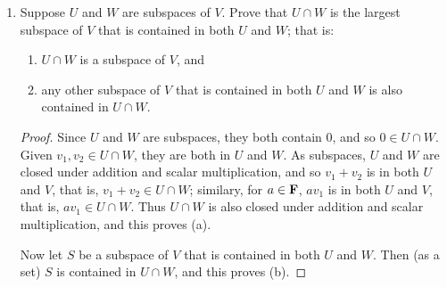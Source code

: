 \documentclass[11pt]{amsart}
\begin{document}
\begin{enumerate}[(1)]
\begin{proof}[Solution]
We claim that $W := \left\{ x^4 p(x) : \, p \in \P(\F) \right\}$ will do the trick (that is, $W$ consists of the zero polynomial and all polynomials that do not have constant, linear, quadratic, or tertiary terms).
$W$ is a subspace because it contains $0$ and is closed under addition and scalar multiplication.
By construction we have $\P(\F) = U+W$ and $U \cap W = \left\{ 0 \right\}$, so by Proposition 1.9, $\P(\F) = U \oplus W$.
\end{proof}

\item Suppose $U$ and $W$ are subspaces of $V$. Prove that $U \cap W$ is the largest subspace of $V$ that is contained in both $U$ and $W$; that is:
  \begin{enumerate} 
  \item $U \cap W$ is a subspace of $V$, and
  \item any other subspace of $V$ that is contained in both $U$ and $W$ is also contained in $U \cap W$.
  \end{enumerate}

\begin{proof}
Since $U$ and $W$ are subspaces, they both contain 0, and so $0 \in U \cap W$.
Given $v_1, v_2 \in U \cap W$, they are both in $U$ and $W$. As subspaces, $U$ and $W$ are closed under addition and scalar multiplication, and so $v_1 + v_2$ is in both $U$ and $V$, that is, $v_1 + v_2 \in U \cap W$; similary, for $a \in \mathbf{F}$, $a v_1$ is in both $U$ and $V$, that is, $a v_1 \in U \cap W$.
Thus $U \cap W$ is also closed under addition and scalar multiplication, and this proves (a).

Now let $S$ be a subspace of $V$ that is contained in both $U$ and $W$. Then (as a set) $S$ is contained in $U \cap W$, and this proves (b).
\end{proof}

\end{enumerate}
\end{document}
